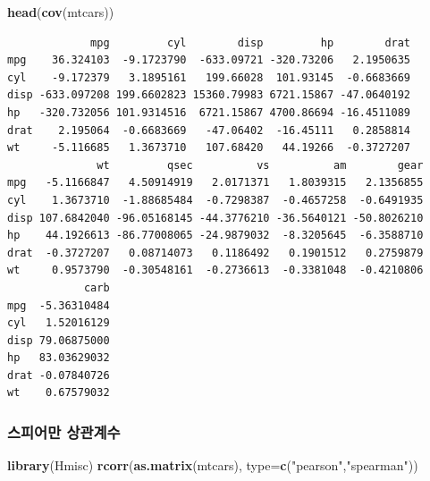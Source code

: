 \documentclass[]{article}
\newenvironment{Shaded}{\begin{snugshade}}{\end{snugshade}}
\newcommand{\KeywordTok}[1]{\textcolor[rgb]{0.13,0.29,0.53}{\textbf{#1}}}
\newcommand{\DataTypeTok}[1]{\textcolor[rgb]{0.13,0.29,0.53}{#1}}
\newcommand{\StringTok}[1]{\textcolor[rgb]{0.31,0.60,0.02}{#1}}
\newcommand{\NormalTok}[1]{#1}
\begin{document}
\begin{Shaded}
\begin{Highlighting}[]
\KeywordTok{head}\NormalTok{(}\KeywordTok{cov}\NormalTok{(mtcars))}
\end{Highlighting}
\end{Shaded}

\begin{verbatim}
             mpg         cyl        disp         hp        drat
mpg    36.324103  -9.1723790  -633.09721 -320.73206   2.1950635
cyl    -9.172379   3.1895161   199.66028  101.93145  -0.6683669
disp -633.097208 199.6602823 15360.79983 6721.15867 -47.0640192
hp   -320.732056 101.9314516  6721.15867 4700.86694 -16.4511089
drat    2.195064  -0.6683669   -47.06402  -16.45111   0.2858814
wt     -5.116685   1.3673710   107.68420   44.19266  -0.3727207
              wt         qsec          vs          am        gear
mpg   -5.1166847   4.50914919   2.0171371   1.8039315   2.1356855
cyl    1.3673710  -1.88685484  -0.7298387  -0.4657258  -0.6491935
disp 107.6842040 -96.05168145 -44.3776210 -36.5640121 -50.8026210
hp    44.1926613 -86.77008065 -24.9879032  -8.3205645  -6.3588710
drat  -0.3727207   0.08714073   0.1186492   0.1901512   0.2759879
wt     0.9573790  -0.30548161  -0.2736613  -0.3381048  -0.4210806
            carb
mpg  -5.36310484
cyl   1.52016129
disp 79.06875000
hp   83.03629032
drat -0.07840726
wt    0.67579032
\end{verbatim}

\subsubsection{스피어만 상관계수}\label{-}

\begin{Shaded}
\begin{Highlighting}[]
\KeywordTok{library}\NormalTok{(Hmisc)}
\KeywordTok{rcorr}\NormalTok{(}\KeywordTok{as.matrix}\NormalTok{(mtcars), }\DataTypeTok{type=}\KeywordTok{c}\NormalTok{(}\StringTok{"pearson"}\NormalTok{,}\StringTok{"spearman"}\NormalTok{))}
\end{Highlighting}
\end{Shaded}
\end{document}
